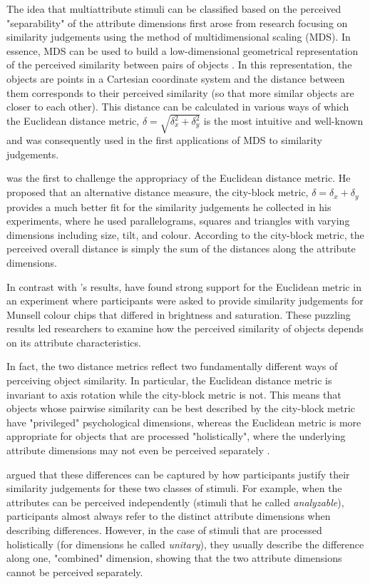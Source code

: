 \documentclass[11pt,a4paper]{article}
\begin{document}
The idea that multiattribute stimuli can be classified based on the perceived "separability" of the attribute dimensions first arose from research focusing on similarity judgements using the method of multidimensional scaling (MDS). In essence, MDS can be used to build a low-dimensional geometrical representation of the perceived similarity between pairs of objects \cite{Hout2013}. In this representation, the objects are points in a Cartesian coordinate system and the distance between them corresponds to their perceived similarity (so that more similar objects are closer to each other). This distance can be calculated in various ways of which the Euclidean distance metric, $\delta = \sqrt{\delta_x^2 + \delta_y^2} $ is the most intuitive and well-known and was consequently used in the first applications of MDS to similarity judgements.

 was the first to challenge the appropriacy of the Euclidean distance metric. He proposed that an alternative distance measure, the city-block metric, $\delta = \delta_x + \delta_y $ provides a much better fit for the similarity judgements he collected in his experiments, where he used parallelograms, squares and triangles with varying dimensions including size, tilt, and colour. According to the city-block metric, the perceived overall distance is simply the sum of the distances along the attribute dimensions.  

In contrast with \citeauthor{Attneave1950}'s results,  have found strong support for the Euclidean metric in an experiment where participants were asked to provide similarity judgements for Munsell colour chips that differed in brightness and saturation. These puzzling results led researchers to examine how the perceived similarity of objects depends on its attribute characteristics. 

In fact, the two distance metrics reflect two fundamentally different ways of perceiving object similarity. In particular, the Euclidean distance metric is invariant to axis rotation while the city-block metric is not. This means that objects whose pairwise similarity can be best described by the city-block metric have "privileged" psychological dimensions, whereas the Euclidean metric is more appropriate for objects that are processed "holistically", where the underlying attribute dimensions may not even be perceived separately \cite{Shepp1989}. 

 argued that these differences can be captured by how participants justify their similarity judgements for these two classes of stimuli. For example, when the attributes can be perceived independently (stimuli that he called \textit{analyzable}), participants almost always refer to the distinct attribute dimensions when describing differences. However, in the case of stimuli that are processed holistically (for dimensions he called \textit{unitary}), they usually describe the difference along one, "combined" dimension, showing that the two attribute dimensions cannot be perceived separately. 
\end{document}
